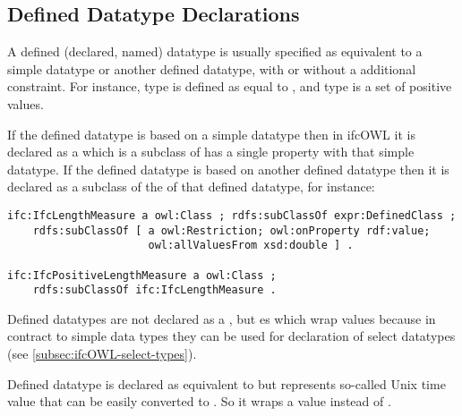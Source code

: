 \subsection{Defined Datatype Declarations}
\label{subsec:ifcOWL-defined-types}

A defined (declared, named) data\-type is usually specified as equivalent to a simple data\-type or another defined data\-type, with or without a additional constraint. For instance, type  is defined as equal to , and type  is a set of positive  values.

\begin{principle}
If the defined data\-type is based on a simple data\-type then in ifcOWL it is declared as a  which is a subclass of  has a single property  with that simple data\-type. If the defined data\-type is based on another defined data\-type then it is declared as a subclass of the  of that defined data\-type, for instance:

\begin{lstlisting}[aboveskip=3pt]
ifc:IfcLengthMeasure a owl:Class ; rdfs:subClassOf expr:DefinedClass ;
    rdfs:subClassOf [ a owl:Restriction; owl:onProperty rdf:value;
                      owl:allValuesFrom xsd:double ] .
                      
ifc:IfcPositiveLengthMeasure a owl:Class ;
    rdfs:subClassOf ifc:IfcLengthMeasure .
\end{lstlisting}
\end{principle}


Defined data\-types are not declared as a , but es which wrap  values because in contract to simple data types they can be used for declaration of select data\-types (see \ref{subsec:ifcOWL-select-types}).

Defined data\-type  is declared as equivalent to  but represents so-called Unix time value that can be easily converted to . So it wraps a  value instead of .



